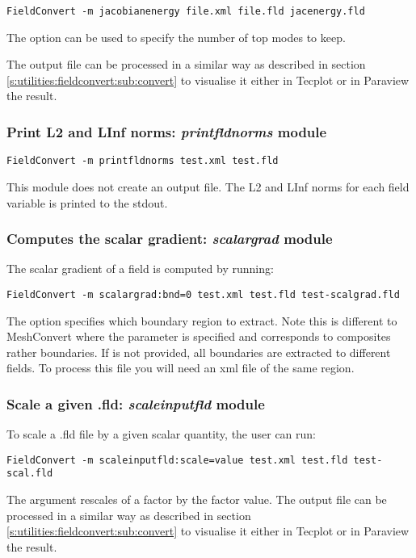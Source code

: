 \begin{lstlisting}[style=BashInputStyle] 
FieldConvert -m jacobianenergy file.xml file.fld jacenergy.fld
\end{lstlisting}

The option  can be used to specify the number of top modes to
keep.

The output file  can be processed in a similar 
way as described in section \ref{s:utilities:fieldconvert:sub:convert}
to visualise it either in Tecplot or in Paraview the result.

%
%
%

\subsubsection{Print L2 and LInf norms: \textit{printfldnorms} module}

\begin{lstlisting}[style=BashInputStyle] 
FieldConvert -m printfldnorms test.xml test.fld 
\end{lstlisting}

This module does not create an output file. The L2 and LInf norms for each field variable is printed to the stdout. 

%
%
%

\subsubsection{Computes the scalar gradient: \textit{scalargrad} module}
The scalar gradient of a field is computed by running:
\begin{lstlisting}[style=BashInputStyle] 
FieldConvert -m scalargrad:bnd=0 test.xml test.fld test-scalgrad.fld
\end{lstlisting}
The option  specifies which boundary region to extract. Note this is different to MeshConvert where the parameter  is specified and corresponds to composites rather boundaries. If  is not provided, all boundaries are extracted to different fields. To process this file you will need an xml file of the same region. 

%
%
%

\subsubsection{Scale a given .fld: \textit{scaleinputfld} module}
To scale a .fld file by a given scalar quantity, the user can run:
\begin{lstlisting}[style=BashInputStyle] 
FieldConvert -m scaleinputfld:scale=value test.xml test.fld test-scal.fld
\end{lstlisting}
The argument  rescales of a factor  
 by the factor value.
The output file  can be processed in a similar 
way as described in section \ref{s:utilities:fieldconvert:sub:convert}
to visualise it either in Tecplot or in Paraview the result.


